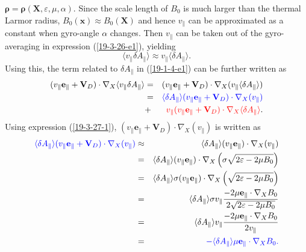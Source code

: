 \documentclass{llncs}
\newcommand{\tmcolor}[2]{{\color{#1}{#2}}}
\newcommand{\tmmathbf}[1]{\ensuremath{\boldsymbol{#1}}}
\begin{document}
$\tmmathbf{\rho}=\tmmathbf{\rho} (\mathbf{X}, \varepsilon, \mu, \alpha)$.
Since the scale length of $B_0$ is much larger than the thermal Larmor radius,
$B_0 (\mathbf{x}) \approx B_0 (\mathbf{X})$ and hence $v_{\parallel}$ can be
approximated as a constant when gyro-angle $\alpha$ changes. Then
$v_{\parallel}$ can be taken out of the gyro-averaging in expression
(\ref{19-3-26-e1}), yielding
\begin{equation}
  \langle v_{\parallel} \delta A_{\parallel} \rangle \approx v_{\parallel}
  \langle \delta A_{\parallel} \rangle .
\end{equation}
Using this, the term related to $\delta A_{\parallel}$ in (\ref{19-1-4-e1})
can be further written as
\begin{eqnarray}
  (v_{\parallel} \mathbf{e}_{\parallel} +\mathbf{V}_D) \cdot \nabla_X \langle
  v_{\parallel} \delta A_{\parallel} \rangle & = & (v_{\parallel}
  \mathbf{e}_{\parallel} +\mathbf{V}_D) \cdot \nabla_X (v_{\parallel} \langle
  \delta A_{\parallel} \rangle) \nonumber\\
  & = & \tmcolor{blue}{\langle \delta A_{\parallel} \rangle (v_{\parallel}
  \mathbf{e}_{\parallel} +\mathbf{V}_D) \cdot \nabla_X (v_{\parallel})}
  \nonumber\\
  & + & \tmcolor{red}{v_{\parallel} (v_{\parallel} \mathbf{e}_{\parallel}
  +\mathbf{V}_D) \cdot \nabla_X \langle \delta A_{\parallel} \rangle} . 
\end{eqnarray}
Using expression (\ref{19-3-27-1}), $(v_{\parallel} \mathbf{e}_{\parallel}
+\mathbf{V}_D) \cdot \nabla_X (v_{\parallel})$ is written as
\begin{eqnarray}
  \tmcolor{blue}{\langle \delta A_{\parallel} \rangle (v_{\parallel}
  \mathbf{e}_{\parallel} +\mathbf{V}_D) \cdot \nabla_X (v_{\parallel})} &
  \approx & \langle \delta A_{\parallel} \rangle (v_{\parallel}
  \mathbf{e}_{\parallel}) \cdot \nabla_X (v_{\parallel}) \nonumber\\
  & = & \langle \delta A_{\parallel} \rangle (v_{\parallel}
  \mathbf{e}_{\parallel}) \cdot \nabla_X \left( \sigma \sqrt{2 \varepsilon - 2
  \mu B_0} \right) \nonumber\\
  & = & \langle \delta A_{\parallel} \rangle \sigma (v_{\parallel}
  \mathbf{e}_{\parallel}) \cdot \nabla_X \left( \sqrt{2 \varepsilon - 2 \mu
  B_0} \right) \nonumber\\
  & = & \langle \delta A_{\parallel} \rangle \sigma v_{\parallel} \frac{- 2
  \mu \mathbf{e}_{\parallel} \cdot \nabla_X B_0}{2 \sqrt{2 \varepsilon - 2 \mu
  B_0}} \nonumber\\
  & = & \langle \delta A_{\parallel} \rangle v_{\parallel} \frac{- 2 \mu
  \mathbf{e}_{\parallel} \cdot \nabla_X B_0}{2 v_{\parallel}} \nonumber\\
  & = & \tmcolor{blue}{- \langle \delta A_{\parallel} \rangle \mu
  \mathbf{e}_{\parallel} \cdot \nabla_X B_0 .} 
\end{eqnarray}
\end{document}
